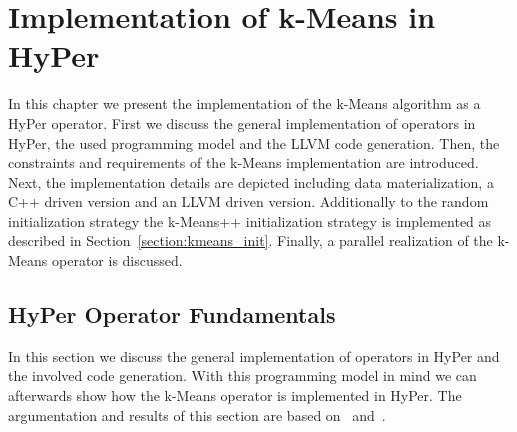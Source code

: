 \chapter{Implementation of k-Means in HyPer}\label{chapter:implementation}

In this chapter we present the implementation of the k-Means algorithm as a HyPer operator. First we discuss the general implementation of operators in HyPer, the used programming model and the LLVM code generation. Then, the constraints and requirements of the k-Means implementation are introduced. Next, the implementation details are depicted including data materialization, a C++ driven version and an LLVM driven version. Additionally to the random initialization strategy the k-Means++ initialization strategy is implemented as described in Section~\ref{section:kmeans_init}. Finally, a parallel realization of the k-Means operator is discussed.


\section{HyPer Operator Fundamentals}\label{section:operator}

In this section we discuss the general implementation of operators in HyPer and the involved code generation. With this programming model in mind we can afterwards show how the k-Means operator is implemented in HyPer. The argumentation and results of this section are based on~\parencite{neumann} and~\parencite{neumann+leis}.


